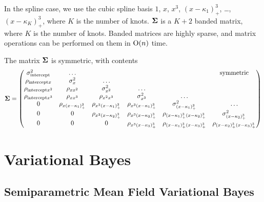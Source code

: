 \documentclass{amsart}[12pt]
\begin{document}
In the spline case, we use the cubic spline basis
$1$, $x$, $x^3$, $(x - \kappa_1)^3_+$, \ldots, $(x - \kappa_K)^3_+$, where $K$ is the number of knots.
${\boldsymbol \Sigma}$ is a $K + 2$ banded matrix, where $K$ is the number of knots. Banded matrices
are highly sparse, and matrix operations can be performed on them in $\text{O}(n)$ time.

The matrix ${\boldsymbol \Sigma}$ is symmetric, with contents
\[
	{\boldsymbol \Sigma} =
	\begin{pmatrix}
		\sigma^2_{\text{intercept}} & \ldots                      &                             &                               &                                          & \text{symmetric}              \\
		\rho_{\text{intercept} x} & \sigma^2_x & \ldots\\
		\rho_{\text{intercept} x^2} & \rho_{x x^2} & \sigma^2_{x^2} & \ldots \\
		\rho_{\text{intercept} x^3} & \rho_{x x^3} & \rho_{x^2 x^3} & \sigma^2_{x^3} & \ldots \\
		0                           & \rho_{x (x - \kappa_1)^3_+} & \rho_{x^2 (x-\kappa_1)_+^3} & \rho_{x^3 (x - \kappa_1)_+^3} & \sigma^2_{(x - \kappa_1)_+^3}            & \ldots                        \\
		0                           & 0                           & \rho_{x^2 (x-\kappa_2)_+^3} & \rho_{x^3 (x-\kappa_2)_+^3}   & \rho_{(x-\kappa_1)_+^3 (x-\kappa_2)_+^3} & \sigma^2_{(x - \kappa_2)_+^3} \\
		0 & 0 & 0 & \rho_{x^3 (x - \kappa_3)_+^3} & \rho_{(x - \kappa_1)_+^3 (x - \kappa_3)_+^3} & \rho_{(x - \kappa_2)_+^3 (x - \kappa_3)_+^3} \\
	\end{pmatrix}
\]



\section{Variational Bayes}
\label{sec:vb}




\subsection{Semiparametric Mean Field Variational Bayes}
\end{document}
